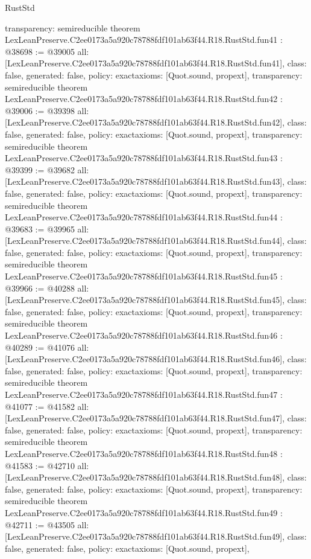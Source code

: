 \begin{lexlean}{RustStd}
\begin{coremodule}
{  transparency: semireducible
}
theorem LexLeanPreserve.C2ee0173a5a920c78788fdf101ab63f44.R18.RustStd.fun41 : @38698 := @39005 {
  all: [LexLeanPreserve.C2ee0173a5a920c78788fdf101ab63f44.R18.RustStd.fun41],
  class: false,
  generated: false,
  policy: exact{axioms: [Quot.sound, propext]},
  transparency: semireducible
}
theorem LexLeanPreserve.C2ee0173a5a920c78788fdf101ab63f44.R18.RustStd.fun42 : @39006 := @39398 {
  all: [LexLeanPreserve.C2ee0173a5a920c78788fdf101ab63f44.R18.RustStd.fun42],
  class: false,
  generated: false,
  policy: exact{axioms: [Quot.sound, propext]},
  transparency: semireducible
}
theorem LexLeanPreserve.C2ee0173a5a920c78788fdf101ab63f44.R18.RustStd.fun43 : @39399 := @39682 {
  all: [LexLeanPreserve.C2ee0173a5a920c78788fdf101ab63f44.R18.RustStd.fun43],
  class: false,
  generated: false,
  policy: exact{axioms: [Quot.sound, propext]},
  transparency: semireducible
}
theorem LexLeanPreserve.C2ee0173a5a920c78788fdf101ab63f44.R18.RustStd.fun44 : @39683 := @39965 {
  all: [LexLeanPreserve.C2ee0173a5a920c78788fdf101ab63f44.R18.RustStd.fun44],
  class: false,
  generated: false,
  policy: exact{axioms: [Quot.sound, propext]},
  transparency: semireducible
}
theorem LexLeanPreserve.C2ee0173a5a920c78788fdf101ab63f44.R18.RustStd.fun45 : @39966 := @40288 {
  all: [LexLeanPreserve.C2ee0173a5a920c78788fdf101ab63f44.R18.RustStd.fun45],
  class: false,
  generated: false,
  policy: exact{axioms: [Quot.sound, propext]},
  transparency: semireducible
}
theorem LexLeanPreserve.C2ee0173a5a920c78788fdf101ab63f44.R18.RustStd.fun46 : @40289 := @41076 {
  all: [LexLeanPreserve.C2ee0173a5a920c78788fdf101ab63f44.R18.RustStd.fun46],
  class: false,
  generated: false,
  policy: exact{axioms: [Quot.sound, propext]},
  transparency: semireducible
}
theorem LexLeanPreserve.C2ee0173a5a920c78788fdf101ab63f44.R18.RustStd.fun47 : @41077 := @41582 {
  all: [LexLeanPreserve.C2ee0173a5a920c78788fdf101ab63f44.R18.RustStd.fun47],
  class: false,
  generated: false,
  policy: exact{axioms: [Quot.sound, propext]},
  transparency: semireducible
}
theorem LexLeanPreserve.C2ee0173a5a920c78788fdf101ab63f44.R18.RustStd.fun48 : @41583 := @42710 {
  all: [LexLeanPreserve.C2ee0173a5a920c78788fdf101ab63f44.R18.RustStd.fun48],
  class: false,
  generated: false,
  policy: exact{axioms: [Quot.sound, propext]},
  transparency: semireducible
}
theorem LexLeanPreserve.C2ee0173a5a920c78788fdf101ab63f44.R18.RustStd.fun49 : @42711 := @43505 {
  all: [LexLeanPreserve.C2ee0173a5a920c78788fdf101ab63f44.R18.RustStd.fun49],
  class: false,
  generated: false,
  policy: exact{axioms: [Quot.sound, propext]},
}
\end{coremodule}
\end{lexlean}
